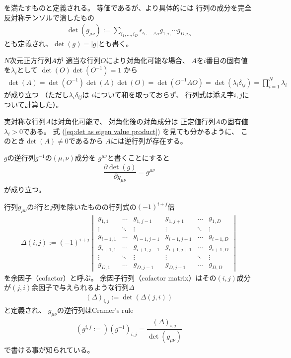を満たすものと定義される。
等価であるが、より具体的には
行列の成分を完全反対称テンソルで潰したもの
\begin{align}
    \det(g_{\mu\nu})
    :=
    \sum_{i_1,\dots,i_D}
    \epsilon_{i_1,\dots,i_D}
    g_{1, i_1}
    \cdots
    g_{D, i_D}
\end{align}
とも定義され、$\det(g) = |g|$とも書く。

$N$次元正方行列$A$が
適当な行列$O$により対角化可能な場合、
$A$を$i$番目の固有値を$\lambda_i$として
$\det( O ) \det( O^{-1} ) = 1$
から
\begin{align}
    \det( A )
=
    \det( O^{-1} )
    \det( A )
    \det( O )
=
    \det( O^{-1} A O )
=
    \det( \lambda_i \delta_{ij} )
=
    \prod_{i=1}^N
        \lambda_i
\label{eq:det as eigen value product}
\end{align}
が成り立つ
（ただし$\lambda_i \delta_{ij}$は
$i$について和を取っておらず、
行列式は添え字$i, j$について計算した）。

実対称な行列$A$は対角化可能で、
対角化後の対角成分は
正定値行列$A$の固有値$\lambda_i >0$である。
式
(\ref{eq:det as eigen value product})
を見ても分かるように、
このとき$\det(A) \neq 0$であるから
$A$には逆行列が存在する。

$g$の逆行列$g^{-1}$の$(\mu,\nu)$成分を
$g^{\mu\nu}$と書くことにすると
\begin{align}
    \dfrac{\partial \det(g)}{\partial g_{\mu\nu}}
    =
    g^{\mu\nu}
\end{align}
が成り立つ。

行列$g_{\mu\nu}$の$i$行と$j$列を除いたものの行列式の$(-1)^{i+j}$倍
\begin{align}
    \Delta(i,j) :=
    (-1)^{i+j}
    \begin{vmatrix}
        g_{1,1} & \dots & g_{1,j-1} & g_{1,j+1} & \dots & g_{1,D}
    \\
        \vdots & \ddots & \vdots & \vdots & \ddots & \vdots
    \\
        g_{i-1,1} & \dots & g_{i-1,j-1} & g_{i-1,j+1} & \dots & g_{i-1,D}
    \\
        g_{i+1,1} & \dots & g_{i+1,j-1} & g_{i+1,j+1} & \dots & g_{i+1,D}
    \\
        \vdots & \ddots & \vdots & \vdots & \ddots & \vdots
    \\
        g_{D,1} & \dots & g_{D,j-1} & g_{D,j+1} & \dots & g_{D,D}
    \end{vmatrix}
\end{align}
を余因子（cofactor）と呼ぶ。
余因子行列（cofactor matrix）はその$(i,j)$成分が$(j,i)$余因子で与えられるような行列$\Delta$
\begin{align}
    (\Delta)_{i,j} := \det(\Delta(j,i))
\end{align}
と定義され、
$g_{\mu\nu}$の逆行列はCramer's rule
\begin{align}
    ( g^{i,j} := )
    (g^{-1})_{i,j}
=
    \dfrac{ (\Delta)_{i,j} }
    { \det(g_{\mu\nu}) }
\end{align}
で書ける事が知られている。

